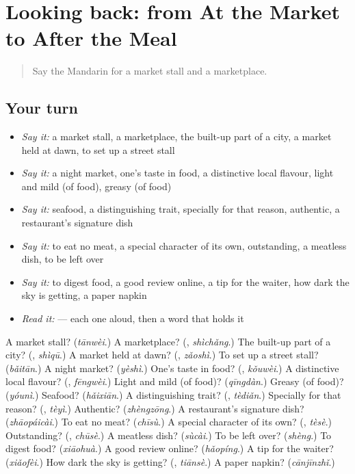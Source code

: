 \section[(dialogue)]{Looking back: from At the Market to After the Meal}

\label{lesson:ZH-R452-review-448-452}



\begin{quote}
Say the Mandarin for a market stall and a marketplace.
\end{quote}

\subsection*{Your turn}
\begin{itemize}
\raggedright
  \item \emph{Say it:} a market stall, a marketplace, the built-up part of a city, a market held at dawn, to set up a street stall
  \item \emph{Say it:} a night market, one's taste in food, a distinctive local flavour, light and mild (of food), greasy (of food)
  \item \emph{Say it:} seafood, a distinguishing trait, specially for that reason, authentic, a restaurant's signature dish
  \item \emph{Say it:} to eat no meat, a special character of its own, outstanding, a meatless dish, to be left over
  \item \emph{Say it:} to digest food, a good review online, a tip for the waiter, how dark the sky is getting, a paper napkin
  \item \emph{Read it:}     — each one aloud, then a word that holds it
\end{itemize}

\begin{tcolorbox}[breakable,colback=teal!4,colframe=teal!35!black,title={Before you move on}]
A market stall? (\emph{tānwèi}.) A marketplace? (\textbf{}, \emph{shìchǎng}.) The built-up part of a city? (\textbf{}, \emph{shìqū}.) A market held at dawn? (\textbf{}, \emph{zǎoshì}.) To set up a street stall? (\emph{bǎitān}.) A night market? (\emph{yèshì}.) One's taste in food? (\textbf{}, \emph{kǒuwèi}.) A distinctive local flavour? (\textbf{}, \emph{fēngwèi}.) Light and mild (of food)? (\emph{qīngdàn}.) Greasy (of food)? (\emph{yóunì}.) Seafood? (\emph{hǎixiān}.) A distinguishing trait? (\textbf{}, \emph{tèdiǎn}.) Specially for that reason? (\textbf{}, \emph{tèyì}.) Authentic? (\emph{zhèngzōng}.) A restaurant's signature dish? (\emph{zhāopáicài}.) To eat no meat? (\emph{chīsù}.) A special character of its own? (\textbf{}, \emph{tèsè}.) Outstanding? (\textbf{}, \emph{chūsè}.) A meatless dish? (\emph{sùcài}.) To be left over? (\emph{shèng}.) To digest food? (\emph{xiāohuà}.) A good review online? (\emph{hǎopíng}.) A tip for the waiter? (\emph{xiǎofèi}.) How dark the sky is getting? (\textbf{}, \emph{tiānsè}.) A paper napkin? (\emph{cānjīnzhǐ}.)
\end{tcolorbox}
